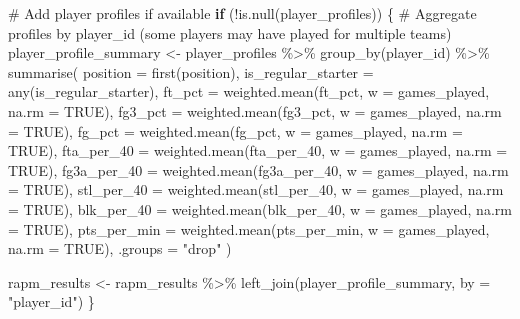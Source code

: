 \documentclass[
  letterpaper,
  DIV=11,
  numbers=noendperiod]{scrartcl}
\newenvironment{Shaded}{\begin{snugshade}}{\end{snugshade}}
\newcommand{\AttributeTok}[1]{\textcolor[rgb]{0.40,0.45,0.13}{#1}}
\newcommand{\CommentTok}[1]{\textcolor[rgb]{0.37,0.37,0.37}{#1}}
\newcommand{\ConstantTok}[1]{\textcolor[rgb]{0.56,0.35,0.01}{#1}}
\newcommand{\ControlFlowTok}[1]{\textcolor[rgb]{0.00,0.23,0.31}{\textbf{#1}}}
\newcommand{\FunctionTok}[1]{\textcolor[rgb]{0.28,0.35,0.67}{#1}}
\newcommand{\NormalTok}[1]{\textcolor[rgb]{0.00,0.23,0.31}{#1}}
\newcommand{\OtherTok}[1]{\textcolor[rgb]{0.00,0.23,0.31}{#1}}
\newcommand{\SpecialCharTok}[1]{\textcolor[rgb]{0.37,0.37,0.37}{#1}}
\newcommand{\StringTok}[1]{\textcolor[rgb]{0.13,0.47,0.30}{#1}}
\begin{document}
\begin{Shaded}
\begin{Highlighting}[]
\CommentTok{\# Add player profiles if available }
\ControlFlowTok{if}\NormalTok{ (}\SpecialCharTok{!}\FunctionTok{is.null}\NormalTok{(player\_profiles)) \{}
  \CommentTok{\# Aggregate profiles by player\_id (some players may have played for multiple teams)}
\NormalTok{  player\_profile\_summary }\OtherTok{\textless{}{-}}\NormalTok{ player\_profiles }\SpecialCharTok{\%\textgreater{}\%}
    \FunctionTok{group\_by}\NormalTok{(player\_id) }\SpecialCharTok{\%\textgreater{}\%}
    \FunctionTok{summarise}\NormalTok{(}
      \AttributeTok{position =} \FunctionTok{first}\NormalTok{(position),}
      \AttributeTok{is\_regular\_starter =} \FunctionTok{any}\NormalTok{(is\_regular\_starter),}
      \AttributeTok{ft\_pct =} \FunctionTok{weighted.mean}\NormalTok{(ft\_pct, }\AttributeTok{w =}\NormalTok{ games\_played, }\AttributeTok{na.rm =} \ConstantTok{TRUE}\NormalTok{),}
      \AttributeTok{fg3\_pct =} \FunctionTok{weighted.mean}\NormalTok{(fg3\_pct, }\AttributeTok{w =}\NormalTok{ games\_played, }\AttributeTok{na.rm =} \ConstantTok{TRUE}\NormalTok{),}
      \AttributeTok{fg\_pct =} \FunctionTok{weighted.mean}\NormalTok{(fg\_pct, }\AttributeTok{w =}\NormalTok{ games\_played, }\AttributeTok{na.rm =} \ConstantTok{TRUE}\NormalTok{),}
      \AttributeTok{fta\_per\_40 =} \FunctionTok{weighted.mean}\NormalTok{(fta\_per\_40, }\AttributeTok{w =}\NormalTok{ games\_played, }\AttributeTok{na.rm =} \ConstantTok{TRUE}\NormalTok{),}
      \AttributeTok{fg3a\_per\_40 =} \FunctionTok{weighted.mean}\NormalTok{(fg3a\_per\_40, }\AttributeTok{w =}\NormalTok{ games\_played, }\AttributeTok{na.rm =} \ConstantTok{TRUE}\NormalTok{),}
      \AttributeTok{stl\_per\_40 =} \FunctionTok{weighted.mean}\NormalTok{(stl\_per\_40, }\AttributeTok{w =}\NormalTok{ games\_played, }\AttributeTok{na.rm =} \ConstantTok{TRUE}\NormalTok{),}
      \AttributeTok{blk\_per\_40 =} \FunctionTok{weighted.mean}\NormalTok{(blk\_per\_40, }\AttributeTok{w =}\NormalTok{ games\_played, }\AttributeTok{na.rm =} \ConstantTok{TRUE}\NormalTok{),}
      \AttributeTok{pts\_per\_min =} \FunctionTok{weighted.mean}\NormalTok{(pts\_per\_min, }\AttributeTok{w =}\NormalTok{ games\_played, }\AttributeTok{na.rm =} \ConstantTok{TRUE}\NormalTok{),}
      \AttributeTok{.groups =} \StringTok{"drop"}
\NormalTok{    )}

\NormalTok{  rapm\_results }\OtherTok{\textless{}{-}}\NormalTok{ rapm\_results }\SpecialCharTok{\%\textgreater{}\%}
    \FunctionTok{left\_join}\NormalTok{(player\_profile\_summary, }\AttributeTok{by =} \StringTok{"player\_id"}\NormalTok{)}
\NormalTok{\}}


\end{Highlighting}
\end{Shaded}
\end{document}
